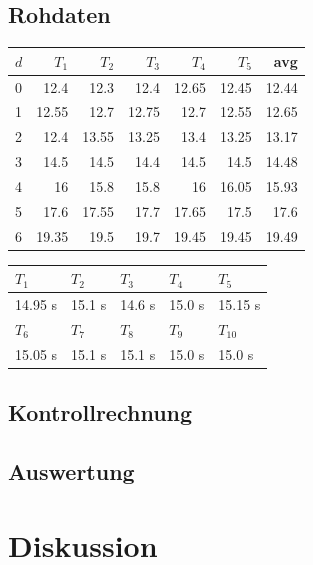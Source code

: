 \documentclass[12pt,a4paper]{article}
\begin{document}
\subsection*{Rohdaten}

\begin{tabular}{|l|r|r|r|r|r|r|}
\hline
$d$&$T_1$&$T_2$&$T_3$&$T_4$&$T_5$&avg \\
\hline
0&12.4&12.3&12.4&12.65&12.45&12.44\\
1&12.55&12.7&12.75&12.7&12.55&12.65\\
2&12.4&13.55&13.25&13.4&13.25&13.17\\
3&14.5&14.5&14.4&14.5&14.5&14.48\\
4&16&15.8&15.8&16&16.05&15.93\\
5&17.6&17.55&17.7&17.65&17.5&17.6\\
6&19.35&19.5&19.7&19.45&19.45&19.49\\
\hline
\end{tabular}

\begin{tabular}{|l|l|l|l|l|}
\hline
$T_{1}$&$T_{2}$&$T_{3}$&$T_{4}$&$T_{5}$\\
\hline
14.95 s&15.1 s&14.6 s&15.0 s&15.15 s\\
\hline
\hline
$T_{6}$&$T_{7}$&$T_{8}$&$T_{9}$&$T_{10}$\\
\hline
15.05 s&15.1 s&15.1 s&15.0 s&15.0 s\\
\hline
\end{tabular}

\subsection*{Kontrollrechnung}

\subsection*{Auswertung}

\section*{Diskussion}
\end{document}
